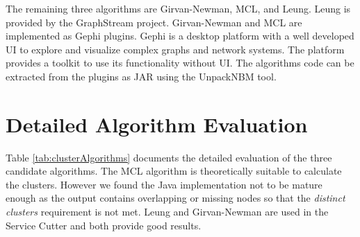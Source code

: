 The remaining three algorithms are Girvan-Newman, MCL, and Leung. Leung is provided by the GraphStream project. Girvan-Newman and MCL are implemented as Gephi plugins. Gephi is a desktop platform with a well developed \gls{UI} to explore and visualize complex graphs and network systems. The platform provides a toolkit to use its functionality without \gls{UI}.  The algorithms code can be extracted from the plugins as \gls{JAR} using the UnpackNBM tool\cite{unpackNBM}.


\section{Detailed Algorithm Evaluation}
\label{appendix:graphClusteringAlgs}

Table \ref{tab:clusterAlgorithms} documents the detailed evaluation of the three candidate algorithms. The \gls{MCL} algorithm is theoretically suitable to calculate the clusters. However we found the Java implementation not to be mature enough as the output contains overlapping or missing nodes so that the \textit{distinct clusters} requirement is not met. Leung and Girvan-Newman are used in the Service Cutter and both provide good results.

